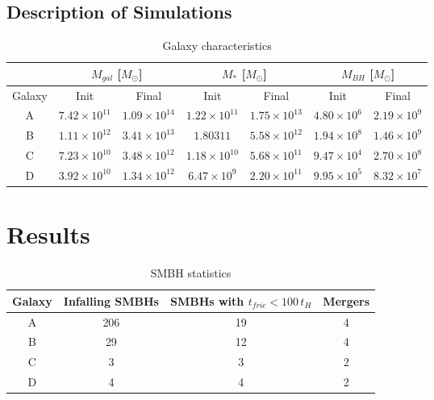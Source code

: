 \documentclass[english, apj]{emulateapj}
\begin{document}
\subsection{Description of Simulations}
\begin{table}
\centering
\caption{Galaxy characteristics}
\begin{tabular}{c| c c| c c| c c}
 & \multicolumn{2}{c}{$M_{gal}$ [$M_{\odot}$]} & 
\multicolumn{2}{c}{$M_{*}$ [$M_{\odot}$]} & 
\multicolumn{2}{c}{$M_{BH}$ [$M_{\odot}$]} \\
\hline
Galaxy & Init & Final & Init & Final & Init & Final \\
 \hline
A & $7.42\times10^{11}$ & $1.09\times10^{14}$  & $1.22\times10^{11}$ & $1.75\times10^{13}$ & $4.80\times10^{6}$ & $2.19\times10^{9}$\\
B & $1.11\times10^{12}$ & $3.41\times10^{13}$ & $1.80\mathrm{3}{11}$ & $5.58\times10^{12}$ & $1.94\times10^{8}$ & $1.46\times10^{9}$\\
C & $7.23\times10^{10}$ & $3.48\times10^{12}$ & $1.18\times10^{10}$ & $5.68\times10^{11}$ & $9.47\times10^{4}$ & $2.70\times10^{8}$\\
D & $3.92\times10^{10}$ & $1.34\times10^{12}$ & $6.47\times10^{9}$ & $2.20\times10^{11}$ & $9.95\times10^{5}$ & $8.32\times10^{7}$\\
\end{tabular}
\end{table}





\section{Results}\label{sec:results}
\begin{table}
\centering
\caption{SMBH statistics}
\begin{tabular}{c| c |c |c}
Galaxy & Infalling SMBHs & SMBHs with $t_{fric}<100\,t_H$ & Mergers \\
\hline
A & 206 & 19 & 4 \\
B & 29 & 12 & 4 \\
C & 3 & 3 & 2 \\
D & 4 & 4 & 2 \\
\end{tabular}
\end{table}
\end{document}
